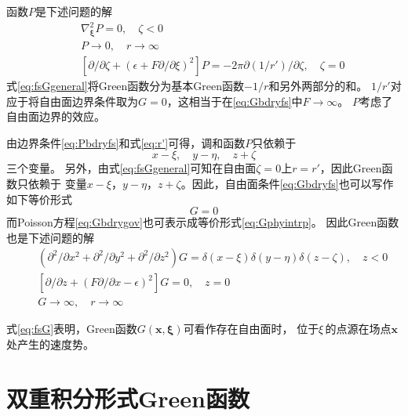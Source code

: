 函数$P$是下述问题的解
\begin{subequations}\label{eq:Pbdry}
  \begin{eqnarray}
    &&\nabla^2_{\bm{\xi}}P=0,\quad \zeta<0\label{eq:Pbdrygov}\\
    &&P\to 0,\quad r\to\infty\label{eq:Pbdryfar}\\
    &&[\partial/\partial\zeta+(\epsilon+F\partial/\partial\xi)^2]P
    =-2\pi\partial(1/r')/\partial\zeta,\quad \zeta=0
    \label{eq:Pbdryfs}
  \end{eqnarray}
\end{subequations}
式\eqref{eq:fsGgeneral}将Green函数分为基本Green函数$-1/r$和另外两部分的和。
$1/r'$对应于将自由面边界条件取为$G=0$，这相当于在\eqref{eq:Gbdryfs}中$F\to\infty$。
$P$考虑了自由面边界的效应。

由边界条件\eqref{eq:Pbdryfs}和式\eqref{eq:r'}可得，调和函数$P$只依赖于
\begin{equation}
  x-\xi,\quad y-\eta,\quad z+\zeta
  \label{eq:3var}
\end{equation}
三个变量。
另外，由式\eqref{eq:fsGgeneral}可知在自由面$\zeta=0$上$r=r'$，因此Green函数只依赖于
变量$x-\xi$，$y-\eta$，$z+\zeta$。因此，自由面条件\eqref{eq:Gbdryfs}也可以写作
如下等价形式
\begin{equation}
  [\partial/\partial z+(F\partial/\partial x-\epsilon)^2]G=0
  \label{eq:Gbdryfs-b}
\end{equation}
而Poisson方程\eqref{eq:Gbdrygov}也可表示成等价形式\eqref{eq:Gphyintrp}。
因此Green函数也是下述问题的解
\begin{subequations}\label{eq:fsG}
  \begin{eqnarray}
    && (\partial^2/\partial x^2+\partial^2/\partial y^2+\partial^2/\partial z^2)G=\delta(x-\xi)\delta(y-\eta)\delta(z-\zeta),\quad z<0
    \label{eq:fsGgov}\\
  &&[\partial/\partial z+(F\partial/\partial x-\epsilon)^2]G=0,\quad z=0
  \label{eq:fsGfs}\\
  && G\to\infty,\quad r\to\infty \label{eq:fsGfar}
  \end{eqnarray}
\end{subequations}

式\eqref{eq:fsG}表明，Green函数$G(\mathbf{x},\bm{\xi})$可看作存在自由面时，
位于$\bf{\xi}$的点源在场点$\mathbf{x}$处产生的速度势。

\section{双重积分形式Green函数}
\label{sec:fsGiint}

